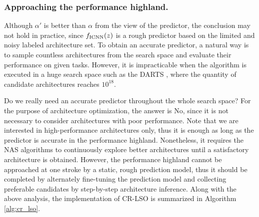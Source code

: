 \documentclass[10pt,twocolumn,letterpaper]{article}
\begin{document}
\subsubsection{Approaching the performance highland.}
Although $\alpha'$ is better than $\alpha$ from the view of the predictor, the conclusion may not hold in practice, since $f_{\rm ICNN}(z)$ is a rough predictor based on the limited and noisy labeled architecture set. To obtain an accurate predictor, a natural way is to sample countless architectures from the search space and evaluate their performance on given tasks. However, it is impracticable when the algorithm is executed in a huge search space such as the DARTS \cite{liu2018darts}, where the quantity of candidate architectures reaches $10^{18}$. 

Do we really need an accurate predictor throughout the whole search space? For the purpose of architecture optimization, the answer is No, since it is not necessary to consider architectures with poor performance. Note that we are interested in high-performance architectures only, thus it is enough as long as the predictor is accurate in the performance highland. Nonetheless, it requires the NAS algorithms to continuously explore better architectures until a satisfactory architecture is obtained. However, the performance highland cannot be approached at one stroke by a static, rough prediction model, thus it should be completed by alternately fine-tuning the prediction model and collecting preferable candidates by step-by-step architecture inference. Along with the above analysis, the implementation of CR-LSO is summarized in Algorithm \ref{alg:cr_lso}. 
\end{document}
